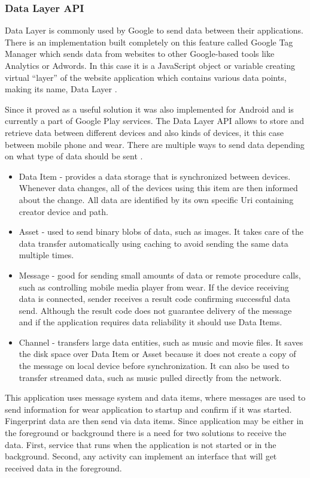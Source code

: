 \subsubsection{Data Layer API}\label{subsec:DataLayerAPI}
Data Layer is commonly used by Google to send data between their applications. There is an implementation built completely on this feature called Google Tag Manager which sends data from websites to other Google-based tools like Analytics or Adwords. In this case it is a JavaScript object or variable creating virtual \enquote{layer} of the website application which contains various data points, making its name, Data Layer \cite{GTMDL}.

Since it proved as a useful solution it was also implemented for Android and is currently a part of Google Play services. The Data Layer API allows to store and retrieve data between different devices and also kinds of devices, it this case between mobile phone and wear. There are multiple ways to send data depending on what type of data should be sent \cite{AD}.

\begin{itemize}
	\item Data Item - provides a data storage that is synchronized between devices. Whenever data changes, all of the devices using this item are then informed about the change. All data are identified by its own specific Uri containing creator device and path.
	\item Asset - used to send binary blobs of data, such as images. It takes care of the data transfer automatically using caching to avoid sending the same data multiple times.
	\item Message - good for sending small amounts of data or remote procedure calls, such as controlling mobile media player from wear. If the device receiving data is connected, sender receives a result code confirming successful data send. Although the result code does not guarantee delivery of the message and if the application requires data reliability it should use Data Items. 
	\item Channel - transfers large data entities, such as music and movie files. It saves the disk space over Data Item or Asset because it does not create a copy of the message on local device before synchronization. It can also be used to transfer streamed data, such as music pulled directly from the network.
\end{itemize}

This application uses message system and data items, where messages are used to send information for wear application to startup and confirm if it was started. Fingerprint data are then send via data items. Since application may be either in the foreground or background there is a need for two solutions to receive the data. First, service that runs when the application is not started or in the background. Second, any activity can implement an interface that will get received data in the foreground.

